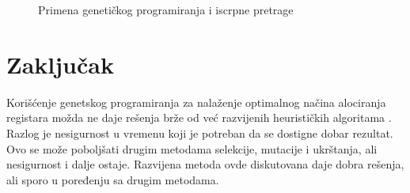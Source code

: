 \documentclass[a4paper, 12pt]{article}
\begin{document}
\begin{figure}
\centering
{}
\qquad
{}
\caption{Primena genetičkog programiranja i iscrpne pretrage}
\label{methodexample2}
\end{figure}

\section{Zaključak}

Korišćenje genetskog programiranja za nalaženje optimalnog načina alociranja registara možda ne daje rešenja brže od već razvijenih heurističkih algoritama \cite{OnLocalRegisterAllocation} \cite{RegisterAllocationByPuzzleSolving}. Razlog je nesigurnost u vremenu koji je potreban da se dostigne dobar rezultat. Ovo se može poboljšati drugim metodama selekcije, mutacije i ukrštanja, ali nesigurnost i dalje ostaje. Razvijena metoda ovde diskutovana daje dobra rešenja, ali sporo u poređenju sa drugim metodama.

\newpage



\end{document}

